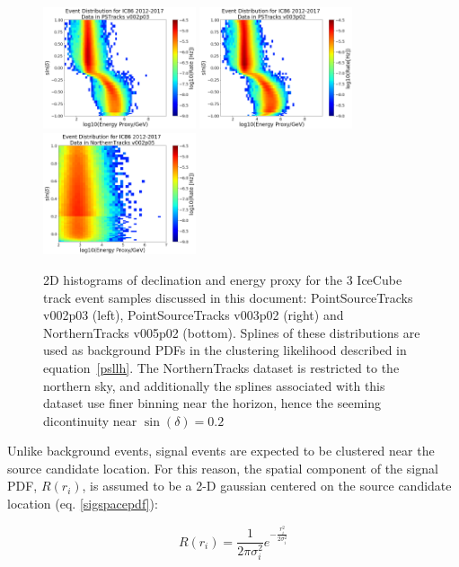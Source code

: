 \begin{figure}[h]
\centering
\includegraphics[width=0.4\textwidth]{figs/psv2_edec.png}
\includegraphics[width=0.4\textwidth]{figs/psv3_edec.png}
\includegraphics[width=0.4\textwidth]{figs/nt_edec.png}
\caption{2D histograms of declination and energy proxy for the 3 IceCube track event samples discussed in this document: PointSourceTracks v002p03 (left), PointSourceTracks v003p02 (right) and NorthernTracks v005p02 (bottom). Splines of these distributions are used as background PDFs in the clustering likelihood described in equation~\ref{psllh}\cite{10yrpublicdata}. The NorthernTracks dataset is restricted to the northern sky, and additionally the splines associated with this dataset use finer binning near the horizon, hence the seeming dicontinuity near $\sin(\delta)=0.2$}
\label{fig:DecEnDist}
\end{figure}

Unlike background events, signal events are expected to be clustered near the source candidate location. For this reason, the spatial component of the signal PDF, $R(r_i)$, is assumed to be a 2-D gaussian centered on the source candidate location (eq. \ref{sigspacepdf}):

\begin{equation}
    R(r_i) = \frac{1}{2\pi\sigma_{i}^2} e ^{-\frac{r_i^2}{2\sigma_i^2}}
    \label{sigspacepdf}
\end{equation}

